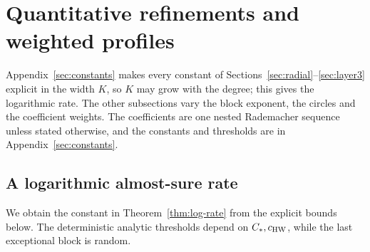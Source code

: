 \section{Quantitative refinements and weighted profiles}\label{sec:extensions}
Appendix~\ref{sec:constants} makes every constant of
Sections~\ref{sec:radial}--\ref{sec:layer3} explicit in the width $K$,
so $K$ may grow with the degree; this gives the logarithmic rate. The other subsections vary the block
exponent, the circles and the coefficient weights. The coefficients are
one nested Rademacher sequence unless stated otherwise, and the
constants and thresholds are in Appendix~\ref{sec:constants}.

\subsection{A logarithmic almost-sure rate}\label{sec:log-rate}
We obtain the constant in Theorem~\ref{thm:log-rate} from the explicit
bounds below.
The deterministic analytic thresholds depend on
$C_*,c_{\rm HW}$, while the last exceptional block is random.
